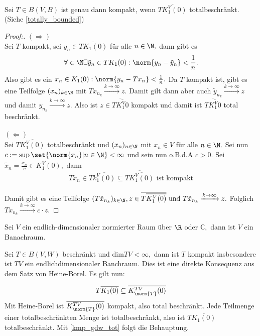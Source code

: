 \begin{theorem} \label{kmp_gdw_tot} Sei $T \in B(V, B)$ ist genau dann kompakt, wenn $\overline{TK_1^V(0)}$ totalbeschränkt. (Siehe \ref{totally_bounded})
	
	
	\begin{proof}[Proof:] $(\Rightarrow)$ \\
		Sei $T$ kompakt, sei $y_n \in \overline{TK_1(0)}$ für alle $n \in \N,$ dann gibt es \[\forall \in \N \exists \tilde y_n \in TK_1(0): \norm{y_n - \tilde y_n} < \frac{1}{n}.\] Also gibt es ein $x_n \in K_1(0): \norm{y_n -Tx_n} < \frac{1}{n}.$ Da $T$ kompakt ist, gibt es eine Teilfolge $(x_n)_{k \in \N}$ mit $Tx_{n_k} \xrightarrow{k \to \infty} z.$ Damit gilt dann aber auch $\tilde y_{n_k} \xrightarrow{k \to \infty} z$ und damit $y_{n_k} \xrightarrow{k \to \infty} z.$ Also ist $z \in \overline{T\overline{K^V_1{0}}}$ kompakt und damit ist $\overline{T\overline{K^V_1{0}}}$ total beschränkt. \\ \\
		$(\Leftarrow)$ \\
		Sei $T\overline{K_1^V(0)}$ totalbeschränkt und $(x_n)_{n \in \N}$ mit $x_n \in V $ für alle $n \in \N.$ Sei nun $c := \sup{\set{\norm{x_n}| n \in \N}} < \infty$ und sein nun o.B.d.A $c > 0.$ Sei $\tilde x_n = \frac{x_n}{c} \in \overline{K_1^V(0)},$ dann \[T\tilde x_n \in T\overline{k_1^V(0)} \subseteq \overline{T\overline{K_1^V(0)}} \text{ ist kompakt}\] \\
		Damit gibt es eine Teilfolge $(T \tilde x_{n_k})_{k \in \N}, z \in \overline{T\overline{K_1^V(0)}} \text{ und } T\tilde x_{n_k} \xrightarrow{k \to \infty} z.$ Folglich $Tx_{n_k} \xrightarrow{k \to \infty} c \cdot z.$
		
	\end{proof}
	
\end{theorem}


\begin{rem} Sei $V$ ein endlich-dimensionaler normierter Raum über $\R$ oder $\mathbb{C},$ dann ist $V$ ein Banachraum. 
	
\end{rem}


\begin{ex}\label{finite_rank_compakt} Sei $T \in B(V, W)$ beschränkt und $\text{dim}{TV} < \infty,$ dann ist $T$ kompakt insbesondere ist $TV$ ein endlichdimensionaler Banchraum. Dies ist eine direkte Konsequenz aus dem Satz von Heine-Borel. Es gilt nun:
	
	
	\[T\overline{K_1(0)} \subseteq \overline{K^{TV}_{\norm{T}}(0)}\]
	Mit Heine-Borel ist $\overline{K^{TV}_{\norm{T}}(0)}$ kompakt, also total beschränkt.  Jede Teilmenge einer totalbeschränkten Menge ist totalbeschränkt, also ist $T\overline{K_1(0)}$ totalbeschränkt. Mit \ref{kmp_gdw_tot} folgt die Behauptung.
	
\end{ex}


